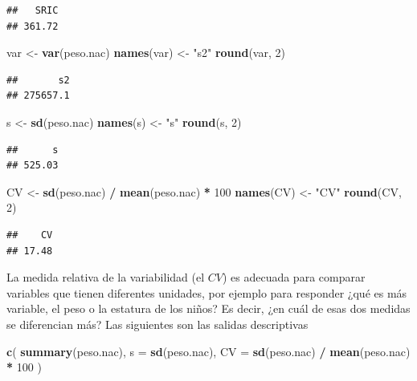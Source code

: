 \documentclass[]{book}
\newenvironment{Shaded}{\begin{snugshade}}{\end{snugshade}}
\newcommand{\DataTypeTok}[1]{\textcolor[rgb]{0.13,0.29,0.53}{#1}}
\newcommand{\DecValTok}[1]{\textcolor[rgb]{0.00,0.00,0.81}{#1}}
\newcommand{\KeywordTok}[1]{\textcolor[rgb]{0.13,0.29,0.53}{\textbf{#1}}}
\newcommand{\NormalTok}[1]{#1}
\newcommand{\OperatorTok}[1]{\textcolor[rgb]{0.81,0.36,0.00}{\textbf{#1}}}
\newcommand{\StringTok}[1]{\textcolor[rgb]{0.31,0.60,0.02}{#1}}
\begin{document}
\begin{verbatim}
##   SRIC 
## 361.72
\end{verbatim}

\begin{Shaded}
\begin{Highlighting}[]
\NormalTok{var <-}\StringTok{ }\KeywordTok{var}\NormalTok{(peso.nac)}
\KeywordTok{names}\NormalTok{(var) <-}\StringTok{ "s2"}
\KeywordTok{round}\NormalTok{(var, }\DecValTok{2}\NormalTok{)}
\end{Highlighting}
\end{Shaded}

\begin{verbatim}
##       s2 
## 275657.1
\end{verbatim}

\begin{Shaded}
\begin{Highlighting}[]
\NormalTok{s <-}\StringTok{ }\KeywordTok{sd}\NormalTok{(peso.nac)}
\KeywordTok{names}\NormalTok{(s) <-}\StringTok{ "s"}
\KeywordTok{round}\NormalTok{(s, }\DecValTok{2}\NormalTok{)}
\end{Highlighting}
\end{Shaded}

\begin{verbatim}
##      s 
## 525.03
\end{verbatim}

\begin{Shaded}
\begin{Highlighting}[]
\NormalTok{CV <-}\StringTok{ }\KeywordTok{sd}\NormalTok{(peso.nac) }\OperatorTok{/}\StringTok{ }\KeywordTok{mean}\NormalTok{(peso.nac) }\OperatorTok{*}\StringTok{ }\DecValTok{100}
\KeywordTok{names}\NormalTok{(CV) <-}\StringTok{ "CV"}
\KeywordTok{round}\NormalTok{(CV, }\DecValTok{2}\NormalTok{)}
\end{Highlighting}
\end{Shaded}

\begin{verbatim}
##    CV 
## 17.48
\end{verbatim}

La medida relativa de la variabilidad (el \(CV\)) es adecuada para comparar variables que tienen diferentes unidades, por ejemplo para responder ¿qué es más variable, el peso o la estatura de los niños? Es decir, ¿en cuál de esas dos medidas se diferencian más? Las siguientes son las salidas descriptivas

\begin{Shaded}
\begin{Highlighting}[]
\KeywordTok{c}\NormalTok{(}
  \KeywordTok{summary}\NormalTok{(peso.nac),}
  \DataTypeTok{s =} \KeywordTok{sd}\NormalTok{(peso.nac),}
  \DataTypeTok{CV =} \KeywordTok{sd}\NormalTok{(peso.nac) }\OperatorTok{/}\StringTok{ }\KeywordTok{mean}\NormalTok{(peso.nac) }\OperatorTok{*}\StringTok{ }\DecValTok{100}
\NormalTok{)}
\end{Highlighting}
\end{Shaded}
\end{document}
